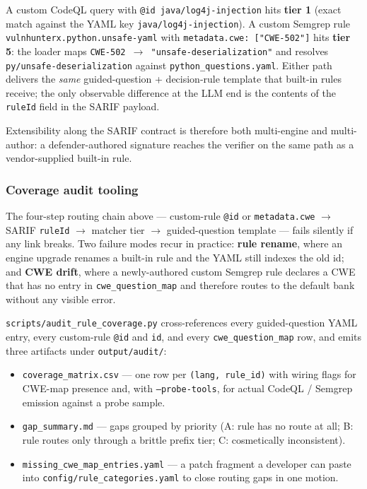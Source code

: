 \documentclass[11pt,a4paper]{article}
\begin{document}
A custom CodeQL query with \texttt{@id java/log4j-injection} hits
\textbf{tier 1} (exact match against the YAML key
\texttt{java/log4j-injection}). A custom Semgrep rule
\texttt{vulnhunterx.python.unsafe-yaml} with
\texttt{metadata.cwe: ["CWE-502"]} hits \textbf{tier 5}: the loader
maps \texttt{CWE-502 $\rightarrow$ "unsafe-deserialization"} and
resolves \texttt{py/unsafe-deserialization} against
\texttt{python\_questions.yaml}. Either path delivers the \emph{same}
guided-question + decision-rule template that built-in rules receive;
the only observable difference at the LLM end is the contents of the
\texttt{ruleId} field in the SARIF payload.

Extensibility along the SARIF contract is therefore both multi-engine
and multi-author: a defender-authored signature reaches the verifier
on the same path as a vendor-supplied built-in rule.

\subsubsection{Coverage audit tooling}

The four-step routing chain above --- custom-rule \texttt{@id} or
\texttt{metadata.cwe} $\rightarrow$ SARIF \texttt{ruleId}
$\rightarrow$ matcher tier $\rightarrow$ guided-question template ---
fails silently if any link breaks. Two failure modes recur in practice:
\textbf{rule rename}, where an engine upgrade renames a built-in rule
and the YAML still indexes the old id; and \textbf{CWE drift}, where a
newly-authored custom Semgrep rule declares a CWE that has no entry in
\texttt{cwe\_question\_map} and therefore routes to the default bank
without any visible error.

\texttt{scripts/audit\_rule\_coverage.py} cross-references every
guided-question YAML entry, every custom-rule \texttt{@id} and
\texttt{id}, and every \texttt{cwe\_question\_map} row, and emits three
artifacts under \texttt{output/audit/}:

\begin{itemize}[leftmargin=*]
\item \texttt{coverage\_matrix.csv} --- one row per
  \texttt{(lang, rule\_id)} with wiring flags for CWE-map presence and,
  with \texttt{--probe-tools}, for actual CodeQL / Semgrep emission
  against a probe sample.
\item \texttt{gap\_summary.md} --- gaps grouped by priority (A: rule
  has no route at all; B: rule routes only through a brittle prefix
  tier; C: cosmetically inconsistent).
\item \texttt{missing\_cwe\_map\_entries.yaml} --- a patch fragment a
  developer can paste into \texttt{config/rule\_categories.yaml} to
  close routing gaps in one motion.
\end{itemize}
\end{document}
